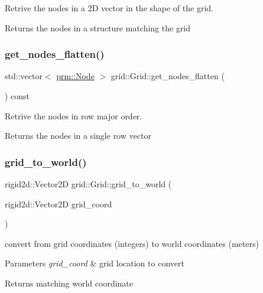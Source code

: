 Retrive the nodes in a 2D vector in the shape of the grid. 

\begin{DoxyReturn}{Returns}
the nodes in a structure matching the grid 
\end{DoxyReturn}
\mbox{\label{classgrid_1_1Grid_adc6f8296117527ab16f352806e9dc1d6}} 
\subsubsection{\texorpdfstring{get\+\_\+nodes\+\_\+flatten()}{get\_nodes\_flatten()}}
{\footnotesize\ttfamily std\+::vector$<$ \hyperlink{structprm_1_1Node}{prm\+::\+Node} $>$ grid\+::\+Grid\+::get\+\_\+nodes\+\_\+flatten (\begin{DoxyParamCaption}{ }\end{DoxyParamCaption}) const}



Retrive the nodes in row major order. 

\begin{DoxyReturn}{Returns}
the nodes in a single row vector 
\end{DoxyReturn}
\mbox{\label{classgrid_1_1Grid_a740d72189efbdf5595c3ddaacc8cdfc4}} 
\subsubsection{\texorpdfstring{grid\+\_\+to\+\_\+world()}{grid\_to\_world()}}
{\footnotesize\ttfamily rigid2d\+::\+Vector2D grid\+::\+Grid\+::grid\+\_\+to\+\_\+world (\begin{DoxyParamCaption}\item[{rigid2d\+::\+Vector2D}]{grid\+\_\+coord }\end{DoxyParamCaption})}



convert from grid coordinates (integers) to world coordinates (meters) 


\begin{DoxyParams}{Parameters}
{\em grid\+\_\+coord} & grid location to convert \\
\hline
\end{DoxyParams}
\begin{DoxyReturn}{Returns}
matching world coordinate 
\end{DoxyReturn}
\mbox{\label{classgrid_1_1Grid_adc9dda8d5d6bca20697790712b154cc1}} 
